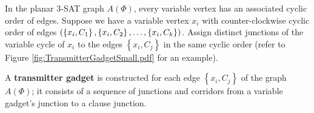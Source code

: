 In the planar 3-SAT graph $A(\Phi)$, every variable vertex has an associated cyclic order of edges.
Suppose we have a variable vertex $x_i$ with counter-clockwise cyclic order of edges $\left( \left\lbrace x_i,C_1\right\rbrace,\left\lbrace x_i,C_2\right\rbrace, \dots, \left\lbrace x_i,C_k\right\rbrace  \right)$.
Assign distinct junctions of the variable cycle of $x_i$ to the edges $\left\lbrace x_i,C_j\right\rbrace$ in the same cyclic order (refer to Figure \ref{fig:TransmitterGadgetSmall.pdf} for an example).


 A {\bf transmitter gadget} is constructed for each edge $\left\lbrace x_i,C_j\right\rbrace$ of the graph $A(\Phi)$; it consists of a sequence of junctions and corridors from a variable gadget's junction to a clause junction.

